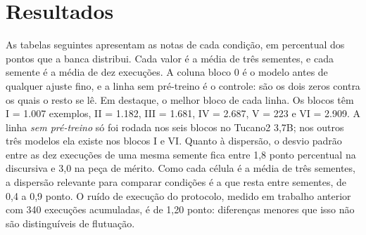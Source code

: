 \documentclass{IOS-Book-Article}
\begin{document}
\section{Resultados}
As tabelas seguintes apresentam as notas de cada condição, em percentual dos pontos que a banca distribui. Cada valor é a média de três sementes, e cada semente é a média de dez execuções. A coluna bloco 0 é o modelo antes de qualquer ajuste fino, e a linha sem pré-treino é o controle: são os dois zeros contra os quais o resto se lê. Em destaque, o melhor bloco de cada linha. Os blocos têm I = 1.007 exemplos, II = 1.182, III = 1.681, IV = 2.687, V = 223 e VI = 2.909. A linha \emph{sem pré-treino} só foi rodada nos seis blocos no Tucano2 3,7B; nos outros três modelos ela existe nos blocos I e VI.
Quanto à dispersão, o desvio padrão entre as dez execuções de uma mesma semente fica entre 1,8 ponto percentual na discursiva e 3,0 na peça de mérito. Como cada célula é a média de três sementes, a dispersão relevante para comparar condições é a que resta entre sementes, de 0,4 a 0,9 ponto. O ruído de execução do protocolo, medido em trabalho anterior com 340 execuções acumuladas, é de 1,20 ponto: diferenças menores que isso não são distinguíveis de flutuação.
\end{document}
